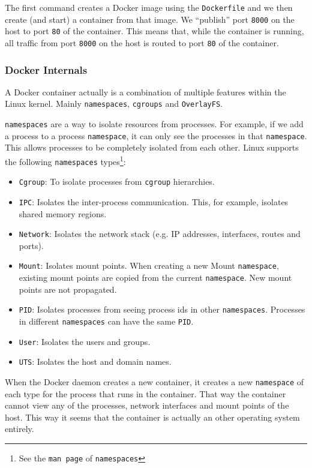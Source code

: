 The first command creates a Docker image using the \lstinline{Dockerfile} and we then create (and start) a container from that image. We ``publish'' port \lstinline{8000} on the host to port \lstinline{80} of the container. This means that, while the container is running, all traffic from port \lstinline{8000} on the host is routed to port \lstinline{80} of the container.

\subsubsection{Docker Internals}
A Docker container actually is a combination of multiple features within the Linux kernel.
Mainly \lstinline{namespaces}, \lstinline{cgroups} and \lstinline{OverlayFS}.

\hfill

\lstinline{namespaces} are a way to isolate resources from processes. For example, if we add a process to a process \lstinline{namespace}, it can only see the processes in that \lstinline{namespace}. This allows processes to be completely isolated from each other. Linux supports the following \lstinline{namespaces} types\footnote{See the \lstinline{man page} of \lstinline{namespaces}}:
\begin{itemize}
    \item \lstinline{Cgroup}: To isolate processes from \lstinline{cgroup} hierarchies.
    \item \lstinline{IPC}: Isolates the inter-process communication. This, for example, isolates shared memory regions.
    \item \lstinline{Network}: Isolates the network stack (e.g. IP addresses, interfaces, routes and ports).
    \item \lstinline{Mount}: Isolates mount points. When creating a new Mount \lstinline{namespace}, existing mount points are copied from the current \lstinline{namespace}. New mount points are not propagated.
    \item \lstinline{PID}: Isolates processes from seeing process ids in other \lstinline{namespaces}. Processes in different \lstinline{namespaces} can have the same \lstinline{PID}.
    \item \lstinline{User}: Isolates the users and groups.
    \item \lstinline{UTS}: Isolates the host and domain names.
\end{itemize}

When the Docker daemon creates a new container, it creates a new \lstinline{namespace} of each type for the process that runs in the container. That way the container cannot view any of the processes, network interfaces and mount points of the host. This way it seems that the container is actually an other operating system entirely.

